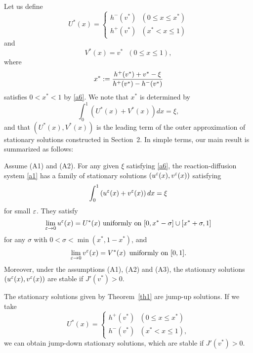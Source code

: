 \documentclass[a4,10pt]{article}
\begin{document}
Let us define 
%
\begin{equation}\label{a8}
U^*(x) = 
\left \{
\begin{array}{l}
h^-(v^*)  \ \ \ (0 \leq x \leq x^*) \\[1ex]
h^+(v^*)  \ \ \ (x^* < x \leq 1) 
\end{array} 
\right.
\end{equation}
%
and
%
\begin{equation}\label{a9}
V^*(x) = v^* \ \ \ ( 0 \leq x \leq 1),
\end{equation}
%
where 
%
\begin{equation}\label{a7}
x^* := \displaystyle\frac{ h^+(v^*) + v^* - \xi}{h^+(v^*) - h^-(v^*)}
\end{equation}
%
satisfies $0 < x^* < 1$ by \eqref{a6}. We note that $x^*$
is determined by
%
$$%
\int_0^1 \left( U^*(x) + V^*(x) \right) dx = \xi,
$$%
%
and that 
$(U^*(x), V^*(x))$ is 
the leading term of the outer approximation of stationary solutions 
constructed in Section~2.
In simple terms, our main result is summarized as follows:

\begin{theo}\label{th1}
Assume (A1) and (A2).
For any given $\xi$ satisfying \eqref{a6}, 
the reaction-diffusion system \eqref{a1} has a 
family of stationary solutions
$(u^{\varepsilon}(x), v^{\varepsilon}(x))$
satisfying 
%
\begin{equation}\label{a2xyz}
\int_0^1 \left( u^\varepsilon(x) + v^\varepsilon(x) \right) dx = \xi 
\end{equation}
%
for small $\varepsilon$. They satisfy 
$$
 \lim_{\ep \to 0} u^\ep(x)  =  U^*(x) \ \mbox{uniformly on} \ [0, x^* - \sigma]
\cup [x^* + \sigma, 1]
$$
for any $\sigma$ with $0 < \sigma < \min(x^*, 1-x^*)$, and 
$$
 \lim_{\ep \to 0} v^\ep(x)  =  V^*(x) \ \, \mbox{uniformly on} \ [0,1]. 
$$
Moreover, under the assumptions (A1), (A2) and (A3), the stationary solutions
$(u^{\varepsilon}(x), v^{\varepsilon}(x))$ are stable if $J'(v^*) > 0 $.
\end{theo}




\begin{remark}\label{rem0x}
The stationary solutions given by Theorem~\ref{th1} are jump-up solutions.
If we take 
%
$$
U^*(x) = 
\left \{
\begin{array}{l}
h^+(v^*)  \ \ \ (0 \leq x \leq x^*) \\[1ex]
h^-(v^*)  \ \ \ (x^* < x \leq 1),
\end{array} 
\right.
$$
%
we can obtain jump-down stationary solutions, which are stable if $J'(v^*) > 0 $.
\end{remark}
\end{document}
